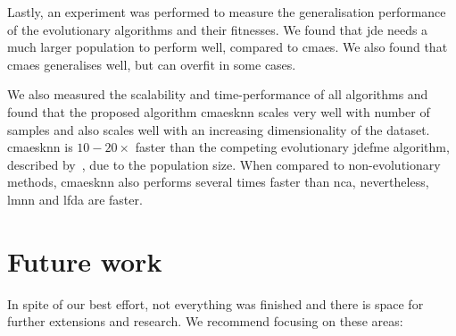 \documentclass[12pt,a4paper]{report}
\begin{document}
Lastly, an experiment was performed to measure the generalisation performance of the evolutionary algorithms and their fitnesses. We found that \ac{jde} needs a much larger population to perform well, compared to \ac{cmaes}. We also found that \ac{cmaes} generalises well, but can overfit in some cases. 

We also measured the scalability and time-performance of all algorithms and found that the proposed algorithm \ac{cmaesknn} scales very well with number of samples and also scales well with an increasing dimensionality of the dataset. \ac{cmaesknn} is $10-20\times$ faster than the competing evolutionary \ac{jdefme} algorithm, described by~\citep{fukui2013evolutionary}, due to the population size. When compared to non-evolutionary methods, \ac{cmaesknn} also performs several times faster than \ac{nca}, nevertheless, \ac{lmnn} and \ac{lfda} are faster.


\chapter{Future work} \label{chap:future-work}


In spite of our best effort, not everything was finished and there is space for further extensions and research. We recommend focusing on these areas:
\end{document}
